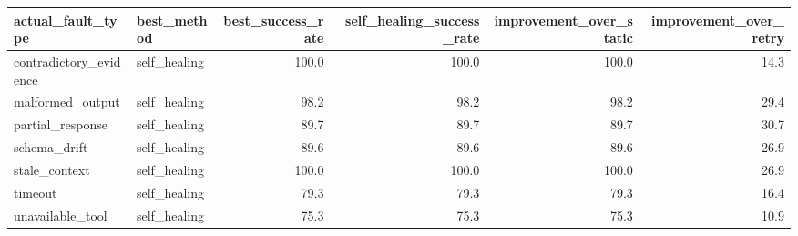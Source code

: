 \begin{tabular}{llrrrr}
\toprule
actual_fault_type & best_method & best_success_rate & self_healing_success_rate & improvement_over_static & improvement_over_retry \\
\midrule
contradictory_evidence & self_healing & 100.0 & 100.0 & 100.0 & 14.3 \\
malformed_output & self_healing & 98.2 & 98.2 & 98.2 & 29.4 \\
partial_response & self_healing & 89.7 & 89.7 & 89.7 & 30.7 \\
schema_drift & self_healing & 89.6 & 89.6 & 89.6 & 26.9 \\
stale_context & self_healing & 100.0 & 100.0 & 100.0 & 26.9 \\
timeout & self_healing & 79.3 & 79.3 & 79.3 & 16.4 \\
unavailable_tool & self_healing & 75.3 & 75.3 & 75.3 & 10.9 \\
\bottomrule
\end{tabular}
